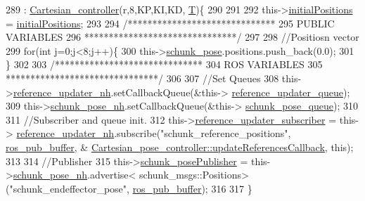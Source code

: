 \begin{DoxyCode}
289                                                                                                            
                                            : \hyperlink{classCartesian__controller_a71055bb1cbf01ced9e64bb1d184b68fe}{Cartesian\_controller}(r,8,KP,KI,KD,
      \hyperlink{classCartesian__controller_a35c6ddbb9624878f2807ff644a33e832}{T})\{
290 
291 
292         this->\hyperlink{classCartesian__pose__controller_a42433d7f2e4e03ccaac56e1f9a7a5027}{initialPositions} = \hyperlink{classCartesian__pose__controller_a42433d7f2e4e03ccaac56e1f9a7a5027}{initialPositions};
293 
294         \textcolor{comment}{/******************************}
295 \textcolor{comment}{                 PUBLIC VARIABLES}
296 \textcolor{comment}{        *******************************/}
297 
298         \textcolor{comment}{//Positiosn vector}
299         \textcolor{keywordflow}{for}(\textcolor{keywordtype}{int} j=0;j<8;j++)\{
300                 this->\hyperlink{classCartesian__pose__controller_a301bc44e901e4837cf036661478354c4}{schunk\_pose}.positions.push\_back(0.0);
301         \}
302 
303         \textcolor{comment}{/******************************}
304 \textcolor{comment}{                  ROS VARIABLES}
305 \textcolor{comment}{        *******************************/}
306 
307         \textcolor{comment}{//Set Queues}
308         this->\hyperlink{classCartesian__pose__controller_ab2d5fe68c8229b6c90f84ac1601eb637}{reference\_updater\_nh}.setCallbackQueue(&this->
      \hyperlink{classCartesian__pose__controller_a6eea82d82ccd6c925be31c18e1b4a432}{reference\_updater\_queue});
309         this->\hyperlink{classCartesian__pose__controller_a41a692189fed59ec8ec8460539f63c66}{schunk\_pose\_nh}.setCallbackQueue(&this->
      \hyperlink{classCartesian__pose__controller_a5efe52a57e5239b3fd86ff456e94691b}{schunk\_pose\_queue});
310 
311         \textcolor{comment}{//Subscriber and queue init.}
312         this->\hyperlink{classCartesian__pose__controller_a9394ae99649279f815c234b1ca7801b6}{reference\_updater\_subscriber}         = this->
      \hyperlink{classCartesian__pose__controller_ab2d5fe68c8229b6c90f84ac1601eb637}{reference\_updater\_nh}.subscribe(\textcolor{stringliteral}{"schunk\_reference\_positions"}, 
      \hyperlink{classCartesian__controller_ab9ed5a808da204dbc612d313dc7332f4}{ros\_pub\_buffer}, &
      \hyperlink{classCartesian__pose__controller_af9c1ec1f565375f50f8a15b16464f94d}{Cartesian\_pose\_controller::updateReferencesCallback}, \textcolor{keyword}{
      this});
313 
314         \textcolor{comment}{//Publisher}
315         this->\hyperlink{classCartesian__pose__controller_a9eb38e771e5006950b9a8075a0ea7e49}{schunk\_posePublisher}   = this->\hyperlink{classCartesian__pose__controller_a41a692189fed59ec8ec8460539f63c66}{schunk\_pose\_nh}.advertise<
      schunk\_msgs::Positions>(\textcolor{stringliteral}{"schunk\_endeffector\_pose"}, \hyperlink{classCartesian__controller_ab9ed5a808da204dbc612d313dc7332f4}{ros\_pub\_buffer});
316 
317 \}
\end{DoxyCode}


